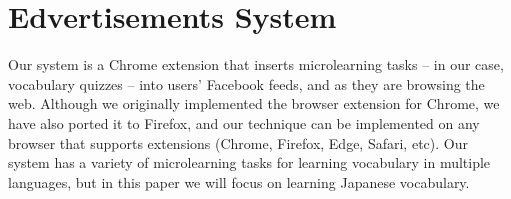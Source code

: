 \documentclass{sigchi}
\begin{document}






\section{Edvertisements System}

Our system is a Chrome extension that inserts microlearning tasks -- in our case, vocabulary quizzes -- into users' Facebook feeds, and as they are browsing the web. Although we originally implemented the browser extension for Chrome, we have also ported it to Firefox, and our technique can be implemented on any browser that supports extensions (Chrome, Firefox, Edge, Safari, etc). Our system has a variety of microlearning tasks for learning vocabulary in multiple languages, but in this paper we will focus on learning Japanese vocabulary.
\end{document}
